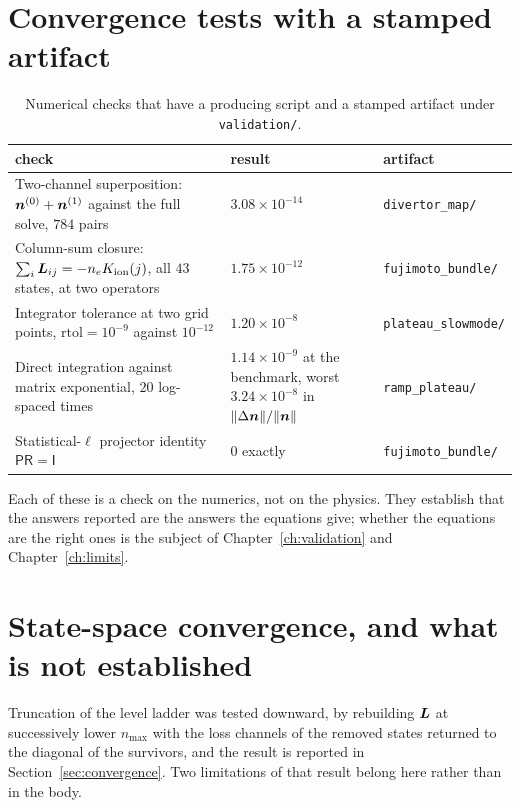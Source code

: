 \section{Convergence tests with a stamped artifact}

\begin{table}[htbp]
  \centering
  \caption[Reproducible numerical checks]{Numerical checks that have a
    producing script and a stamped artifact under \texttt{validation/}.}
  \label{tab:numerical_checks}
  \small
  \begin{tabular}{@{}p{5.2cm}p{3.1cm}p{5.0cm}@{}}
    \toprule
    check & result & artifact \\
    \midrule
    Two-channel superposition: $\bm{n}^{(0)} + \bm{n}^{(1)}$ against the full solve, $784$ pairs
      & $3.08\times10^{-14}$
      & \texttt{divertor\_map/} \\
    Column-sum closure: $\sum_i \bm{L}_{ij} = -n_e K_{\rm ion}(j)$, all $43$ states, at two operators
      & $1.75\times10^{-12}$
      & \texttt{fujimoto\_bundle/} \\
    Integrator tolerance at two grid points, $\mathrm{rtol}=10^{-9}$ against $10^{-12}$
      & $1.20\times10^{-8}$
      & \texttt{plateau\_slowmode/} \\
    Direct integration against matrix exponential, $20$ log-spaced times
      & $1.14\times10^{-9}$ at the benchmark, worst $3.24\times10^{-8}$ in $\|\Delta\bm{n}\|/\|\bm{n}\|$
      & \texttt{ramp\_plateau/} \\
    Statistical-$\ell$ projector identity $\mathsf{P}\mathsf{R} = \mathsf{I}$
      & $0$ exactly
      & \texttt{fujimoto\_bundle/} \\
    \bottomrule
  \end{tabular}
\end{table}

\noindent Each of these is a check on the numerics, not on the physics. They
establish that the answers reported are the answers the equations give; whether
the equations are the right ones is the subject of Chapter~\ref{ch:validation}
and Chapter~\ref{ch:limits}.

\section{State-space convergence, and what is not established}

Truncation of the level ladder was tested downward, by rebuilding $\bm{L}$ at
successively lower $n_{\max}$ with the loss channels of the removed states
returned to the diagonal of the survivors, and the result is reported in
Section~\ref{sec:convergence}. Two limitations of that result belong here rather
than in the body.

